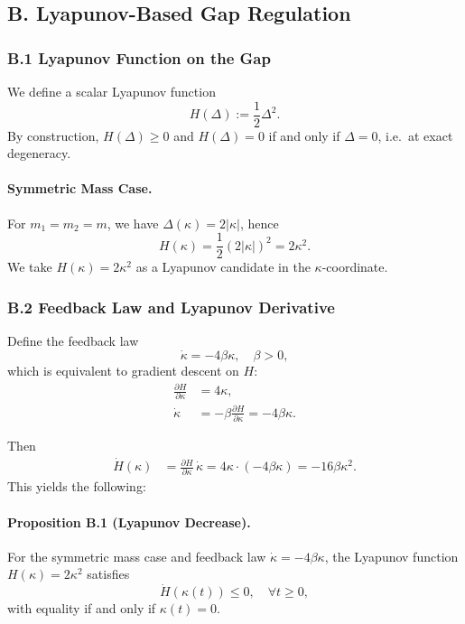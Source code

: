 \documentclass[11pt]{article}
\begin{document}
\subsection*{B. Lyapunov-Based Gap Regulation}

\subsubsection*{B.1 Lyapunov Function on the Gap}

We define a scalar Lyapunov function
\begin{equation}
  H(\Delta) := \frac{1}{2}\Delta^2.
\end{equation}
By construction, $H(\Delta)\ge 0$ and $H(\Delta)=0$ if and only if $\Delta=0$, i.e.\ at exact degeneracy.

\paragraph{Symmetric Mass Case.} For $m_1=m_2=m$, we have $\Delta(\kappa)=2|\kappa|$, hence
\begin{equation}
  H(\kappa) = \frac{1}{2}(2|\kappa|)^2 = 2\kappa^2.
\end{equation}
We take $H(\kappa) = 2\kappa^2$ as a Lyapunov candidate in the $\kappa$-coordinate.

\subsubsection*{B.2 Feedback Law and Lyapunov Derivative}

Define the feedback law
\begin{equation}
  \dot\kappa = -4\beta\kappa, \quad \beta>0,
\end{equation}
which is equivalent to gradient descent on $H$:
\begin{align}
  \frac{\partial H}{\partial \kappa}
  &= 4\kappa,\\
  \dot\kappa
  &= -\beta\frac{\partial H}{\partial \kappa}
   = -4\beta\kappa.
\end{align}

Then
\begin{align}
  \dot H(\kappa)
  &= \frac{\partial H}{\partial \kappa}\,\dot\kappa
   = 4\kappa \cdot (-4\beta\kappa)
   = -16\beta\kappa^2.
\end{align}
This yields the following:

\paragraph{Proposition B.1 (Lyapunov Decrease).} For the symmetric mass case and feedback law $\dot\kappa=-4\beta\kappa$, the Lyapunov function $H(\kappa)=2\kappa^2$ satisfies
\[
  \dot H(\kappa(t)) \le 0,\quad \forall t\ge 0,
\]
with equality if and only if $\kappa(t)=0$.
\end{document}
